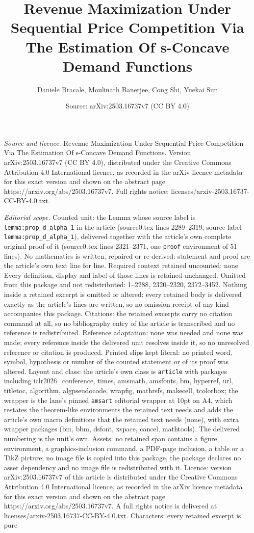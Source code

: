 \documentclass[10pt,a4paper]{amsart}
\title[Revenue Maximization Under Sequential Price Competition Via ]{Revenue Maximization Under Sequential Price Competition Via The Estimation Of s-Concave Demand Functions}
\author{Daniele Bracale, Moulinath Banerjee, Cong Shi, Yuekai Sun}
\date{Source: arXiv:2503.16737v7 (CC BY 4.0)}
\begin{document}
\maketitle

\noindent\emph{Source and licence.} Revenue Maximization Under Sequential Price Competition Via The Estimation Of s-Concave Demand Functions. Version arXiv:2503.16737v7 (CC BY 4.0), distributed under the Creative Commons Attribution 4.0 International licence, as recorded in the arXiv licence metadata for this exact version and shown on the abstract page https://arxiv.org/abs/2503.16737v7. Full rights notice: licenses/arxiv-2503.16737-CC-BY-4.0.txt.\par\smallskip

\noindent\textit{Editorial scope.} Counted unit: the Lemma whose source label is \texttt{lemma:prop\_d\_alpha\_1} in the article (source0.tex lines 2289--2319, source label \texttt{lemma:prop\_d\_alpha\_1}), delivered together with the article's own complete original proof of it (source0.tex lines 2321--2371, one \texttt{proof} environment of 51 lines). No mathematics is written, repaired or re-derived: statement and proof are the article's own text line for line. Required context retained uncounted: none. Every definition, display and label of those lines is retained unchanged. Omitted from this package and not redistributed: 1--2288, 2320--2320, 2372--3452. Nothing inside a retained excerpt is omitted or altered: every retained body is delivered exactly as the article's lines are written, so no omission receipt of any kind accompanies this package. Citations: the retained excerpts carry no citation command at all, so no bibliography entry of the article is transcribed and no reference is redistributed. Reference adaptation: none was needed and none was made; every reference inside the delivered unit resolves inside it, so no unresolved reference or citation is produced. Printed slips kept literal: no printed word, symbol, hypothesis or number of the counted statement or of its proof was altered. Layout and class: the article's own class is \texttt{article} with packages including iclr2026\_conference, times, amsmath, amsfonts, bm, hyperref, url, titletoc, algorithm, algpseudocode, wrapfig, mathrsfs, makecell, tcolorbox; the wrapper is the lane's pinned \texttt{amsart} editorial wrapper at 10pt on A4, which restates the theorem-like environments the retained text needs and adds the article's own macro definitions that the retained text needs (none), with extra wrapper packages (bm, bbm, dsfont, xspace, cancel, mathtools). The delivered numbering is the unit's own. Assets: no retained span contains a figure environment, a graphics-inclusion command, a PDF-page inclusion, a table or a TikZ picture; no image file is copied into this package, the package declares no asset dependency and no image file is redistributed with it. Licence: version arXiv:2503.16737v7 of this article is distributed under the Creative Commons Attribution 4.0 International licence, as recorded in the arXiv licence metadata for this exact version and shown on the abstract page https://arxiv.org/abs/2503.16737v7. A full rights notice is delivered at licenses/arxiv-2503.16737-CC-BY-4.0.txt. Characters: every retained excerpt is pure 
\end{document}
